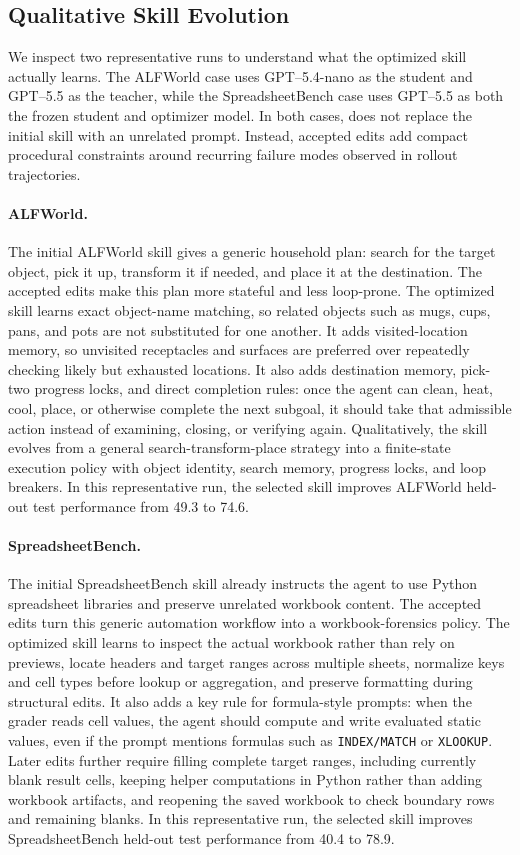\subsection{Qualitative Skill Evolution}
\label{sec:qualitative_skill_evolution}

We inspect two representative runs to understand what the optimized skill actually learns. The ALFWorld case uses GPT--5.4-nano as the student and GPT--5.5 as the teacher, while the SpreadsheetBench case uses GPT--5.5 as both the frozen student and optimizer model. In both cases, \ourmethod{} does not replace the initial skill with an unrelated prompt. Instead, accepted edits add compact procedural constraints around recurring failure modes observed in rollout trajectories.

\paragraph{ALFWorld.}
The initial ALFWorld skill gives a generic household plan: search for the target object, pick it up, transform it if needed, and place it at the destination. The accepted edits make this plan more stateful and less loop-prone. The optimized skill learns exact object-name matching, so related objects such as mugs, cups, pans, and pots are not substituted for one another. It adds visited-location memory, so unvisited receptacles and surfaces are preferred over repeatedly checking likely but exhausted locations. It also adds destination memory, pick-two progress locks, and direct completion rules: once the agent can clean, heat, cool, place, or otherwise complete the next subgoal, it should take that admissible action instead of examining, closing, or verifying again. Qualitatively, the skill evolves from a general search-transform-place strategy into a finite-state execution policy with object identity, search memory, progress locks, and loop breakers. In this representative run, the selected skill improves ALFWorld held-out test performance from 49.3 to 74.6.

\paragraph{SpreadsheetBench.}
The initial SpreadsheetBench skill already instructs the agent to use Python spreadsheet libraries and preserve unrelated workbook content. The accepted edits turn this generic automation workflow into a workbook-forensics policy. The optimized skill learns to inspect the actual workbook rather than rely on previews, locate headers and target ranges across multiple sheets, normalize keys and cell types before lookup or aggregation, and preserve formatting during structural edits. It also adds a key rule for formula-style prompts: when the grader reads cell values, the agent should compute and write evaluated static values, even if the prompt mentions formulas such as \texttt{INDEX/MATCH} or \texttt{XLOOKUP}. Later edits further require filling complete target ranges, including currently blank result cells, keeping helper computations in Python rather than adding workbook artifacts, and reopening the saved workbook to check boundary rows and remaining blanks. In this representative run, the selected skill improves SpreadsheetBench held-out test performance from 40.4 to 78.9.
